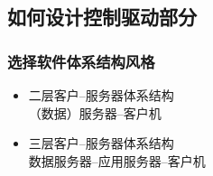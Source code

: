 \documentclass[compress]{beamer}
\begin{document}
\subsection[如何设计]{如何设计控制驱动部分}

\begin{frame}
  \frametitle{选择软件体系结构风格}

  \begin{itemize}
    \item 二层客户--服务器体系结构 \\
    （数据）服务器--客户机
    \item 三层客户--服务器体系结构 \\
    数据服务器--应用服务器--客户机 
  \end{itemize}
\end{frame}
\end{document}
